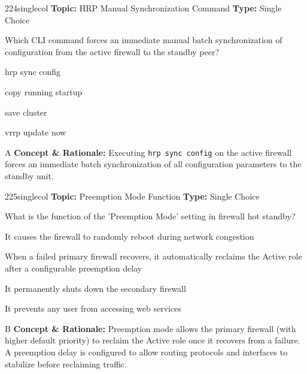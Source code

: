 \begin{qcard}{224}{singlecol}
\textcolor{darkslate!75}{\small\textbf{Topic:} HRP Manual Synchronization Command \hfill \textbf{Type:} Single Choice}\vspace{0.4em}\par
Which CLI command forces an immediate manual batch synchronization of configuration from the active firewall to the standby peer?
\begin{qoptions}
\item hrp sync config
\item copy running startup
\item save cluster
\item vrrp update now
\end{qoptions}
\end{qcard}
\nopagebreak
\begin{explainbox}{A}
\textbf{Concept \& Rationale:} Executing \texttt{hrp sync config} on the active firewall forces an immediate batch synchronization of all configuration parameters to the standby unit.
\end{explainbox}

\begin{qcard}{225}{singlecol}
\textcolor{darkslate!75}{\small\textbf{Topic:} Preemption Mode Function \hfill \textbf{Type:} Single Choice}\vspace{0.4em}\par
What is the function of the 'Preemption Mode' setting in firewall hot standby?
\begin{qoptions}
\item It causes the firewall to randomly reboot during network congestion
\item When a failed primary firewall recovers, it automatically reclaims the Active role after a configurable preemption delay
\item It permanently shuts down the secondary firewall
\item It prevents any user from accessing web services
\end{qoptions}
\end{qcard}
\nopagebreak
\begin{explainbox}{B}
\textbf{Concept \& Rationale:} Preemption mode allows the primary firewall (with higher default priority) to reclaim the Active role once it recovers from a failure. A preemption delay is configured to allow routing protocols and interfaces to stabilize before reclaiming traffic.
\end{explainbox}

